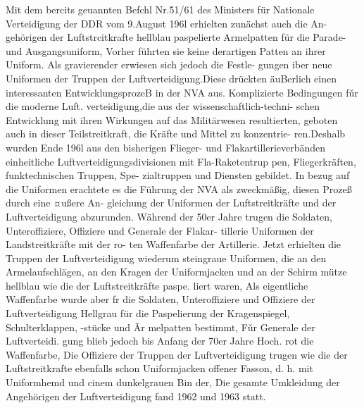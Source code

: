 Mit dem bercits geuannten Befchl Nr.51/61 des
Ministers für Nationale Verteidigung der DDR
vom 9.August 196l erhielten zunächst auch die An-
gehörigen der Luftstrcitkrafte hellblau paspelierte
Armelpatten für die Parade- und Ausgangsuniform,
Vorher führten sie keine derartigen Patten an ihrer
Uniform.
Als gravierender erwiesen sich jedoch die Festle-
gungen iber neue Uniformen der Truppen der
Luftverteidigung.Diese drückten äuBerlich einen
interessanten EntwicklungsprozeB in der NVA aus.
Komplizierte Bedingungen fǔr die moderne Luft.
verteidigung,die aus der wissenschaftlich-techni-
schen Entwicklung mit ihren Wirkungen auf das
Militärwesen resultierten, geboten auch in dieser
Teilstreitkraft, die Kräfte und Mittel zu konzentrie-
ren.Deshalb wurden Ende 196l aus den bisherigen
Flieger- und Flakartillerieverbänden einheitliche
Luftverteidigungsdivisionen mit Fla-Raketentrup
pen, Fliegerkräften, funktechnischen Truppen, Spe-
zialtruppen und Diensten gebildet. In bezug auf die
Uniformen erachtete es die Führung der NVA als
zweckmäßig, diesen Prozeß durch eine ¤ußere An-
gleichung der Uniformen der Luftstreitkräfte und
der Luftverteidigung abzurunden.
Während der 50er Jahre trugen die Soldaten,
Unteroffiziere, Offiziere und Generale der Flakar-
tillerie Uniformen der Landstreitkräfte mit der ro-
ten Waffenfarbe der Artillerie. Jetzt erhielten die Truppen der Luftverteidigung wiederum steingraue
Uniformen, die an den Armelaufschlägen, an den
Kragen der Uniformjacken und an der Schirm
mütze hellblau wie die der Luftstreitkräfte paspe.
liert waren, Als eigentliche Waffenfarbe wurde aber
fr die Soldaten, Unteroffiziere und Offiziere der
Luftverteidigung Hellgrau für die Paspelierung der
Kragenspiegel, Schulterklappen, -stücke und Ãr
melpatten bestimmt, Fǔr Generale der Luftverteidi.
gung blieb jedoch bis Anfang der 70er Jahre Hoch.
rot die Waffenfarbe, Die Offiziere der Truppen der
Luftverteidigung trugen wie die der Luftstreitkrafte
ebenfalls schon Uniformjacken offener Fasson, d. h.
mit Uniformhemd und cinem dunkelgrauen Bin
der, Die gesamte Umkleidung der Angehörigen der
Luftverteidigung fand 1962 und 1963 statt.
